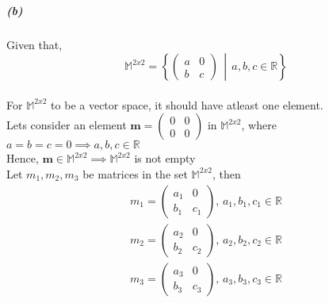 \documentclass[12pt, letterpaper]{article}
\newcommand{\M}{\mathbb{M}^{2x2}}
\begin{document}

\subparagraph{(b)} Given that,
\[
  \label{1b}
  \M =
  \left\{
    \begin{pmatrix}a &0\\b &c\end{pmatrix} \, \middle| \, a,b,c \in \mathbb{R} 
  \right\}
\]\\
For $\M$ to be a vector space, it should have atleast one element.\\
Lets consider an element
$\mathbf{m} = \begin{pmatrix}0&0\\0&0\end{pmatrix}$ in
$\M$, where $a = b = c = 0 \implies a,b,c\in\mathbb{R}$\\
Hence, $\mathbf{m}\in\M \implies \M$ is not empty\\

Let $m_1, m_2, m_3$ be matrices in the set $\M$, then
\[
  \label{1b1}
  \begin{split}
    m_1 = \begin{pmatrix}a_1 &0\\b_1 &c_1\end{pmatrix}, \, a_1, b_1, c_1 \in \mathbb{R}\\
    m_2 = \begin{pmatrix}a_2 &0\\b_2 &c_2\end{pmatrix}, \, a_2, b_2, c_2 \in \mathbb{R}\\
    m_3 = \begin{pmatrix}a_3 &0\\b_3 &c_3\end{pmatrix}, \, a_3, b_3, c_3 \in \mathbb{R}\\
  \end{split}
\]
\end{document}
